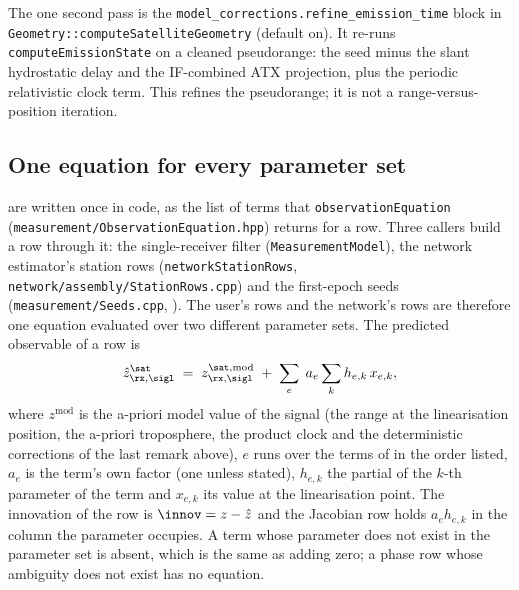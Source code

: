The one second pass is the \texttt{model\_corrections.refine\_emission\_time}
block in \texttt{Geometry::computeSatelliteGeometry} (default on).  It
re-runs \texttt{computeEmissionState} on a cleaned pseudorange: the seed
minus the slant hydrostatic delay and the IF-combined ATX projection,
plus the periodic relativistic clock term.  This refines the
pseudorange; it is not a range-versus-position iteration.

\subsection{One equation for every parameter set}\label{sec:obs-shared}

 are written once in code, as the list of
terms that \texttt{observationEquation}
(\texttt{measurement/ObservationEquation.hpp}) returns for a row.  Three
callers build a row through it: the single-receiver filter
(\texttt{MeasurementModel}), the network estimator's station rows
(\texttt{networkStationRows}, \texttt{network/assembly/StationRows.cpp}) and
the first-epoch seeds (\texttt{measurement/Seeds.cpp},
).  The user's rows and the network's rows are
therefore one equation evaluated over two different parameter sets.  The
predicted observable of a row is
\begin{equation}
\hat z^\sat_{\rx,\sigl}
\;=\; z^{\sat,\mathrm{mod}}_{\rx,\sigl}
\;+\; \sum_{e}\; a_e \sum_{k} h_{e,k}\,x_{e,k},
\label{eq:obs-terms}
\end{equation}
where $z^{\mathrm{mod}}$ is the a-priori model value of the signal (the
range at the linearisation position, the a-priori troposphere, the product
clock and the deterministic corrections of the last remark above), $e$ runs
over the terms of  in the order listed, $a_e$ is the
term's own factor (one unless stated), $h_{e,k}$ the partial of the
$k$-th parameter of the term and $x_{e,k}$ its value at the linearisation
point.  The innovation of the row is $\innov = z - \hat z$ and the
Jacobian row holds $a_e h_{e,k}$ in the column the parameter occupies.  A
term whose parameter does not exist in the parameter set is absent, which
is the same as adding zero; a phase row whose ambiguity does not exist has
no equation.

